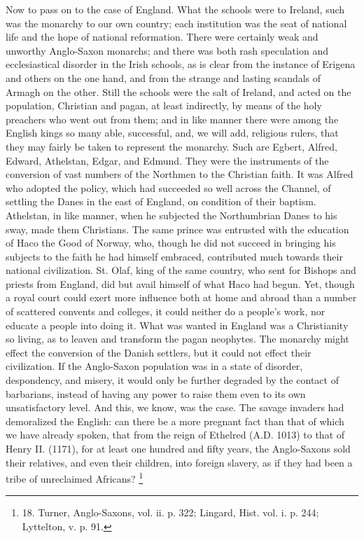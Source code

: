 Now to pass on to the case of
England. What the schools were to Ireland, such was the monarchy to
our own country; each institution was the seat of national life and
the hope of national reformation. There were certainly weak and
unworthy Anglo-Saxon monarchs; and there was both rash speculation and
ecclesiastical disorder in the Irish schools, as is clear from the
instance of Erigena and others on the one hand, and from the strange
and lasting scandals of Armagh on the other. Still the schools were
the salt of Ireland, and acted on the population, Christian and pagan,
at least indirectly, by means of the holy preachers who went out from
them; and in like manner there were among the English kings so many
able, successful, and, we will add, religious rulers, that they may
fairly be taken to represent the monarchy. Such are Egbert, Alfred,
Edward, Athelstan, Edgar, and Edmund. They were the instruments of the
conversion of vast numbers of the Northmen to the Christian
faith. It was Alfred who adopted the policy, which had succeeded so
well across the Channel, of settling the Danes in the east of England,
on condition of their baptism. Athelstan, in like manner, when he
subjected the Northumbrian Danes to his sway, made them Christians.
The same prince was entrusted with the education of Haco the Good of
Norway, who, though he did not succeed in bringing his subjects to the
faith he had himself embraced, contributed much towards their national
civilization. St. Olaf, king of the same country, who sent for Bishops
and priests from England, did but avail himself of what Haco had
begun. Yet, though a royal court could exert more influence both at
home and abroad than a number of scattered convents and colleges, it
could neither do a people's work, nor educate a people into doing it.
What was wanted in England was a Christianity so living, as to leaven
and transform the pagan neophytes. The monarchy might effect the
conversion of the Danish settlers, but it could not effect their
civilization. If the Anglo-Saxon population was in a state of
disorder, despondency, and misery, it would only be further degraded
by the contact of barbarians, instead of having any power to raise
them even to its own unsatisfactory level. And this, we know, was the
case. The savage invaders had demoralized the English: can there be a
more pregnant fact than that of which we have already spoken, that
from the reign of Ethelred (A.D. 1013) to that of Henry II. (1171), for at
least one hundred and fifty years, the Anglo-Saxons sold their
relatives, and even their children, into foreign slavery, as if they
had been a tribe of unreclaimed Africans? \footnote{18.
Turner, Anglo-Saxons, vol. ii. p. 322; Lingard, Hist. vol. i. p. 244;
Lyttelton, v. p. 91.}


